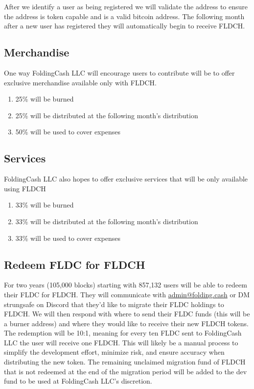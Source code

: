 \documentclass[letterpaper,12pt,titlepage]{article}
\makeatletter
\def\adminEmail{\href{mailto:admin@folding.cash}{admin@folding.cash}}
\def\org{FoldingCash LLC}
\def\ticker{FLDCH}
\def\startingBlock{857,132}
\makeatother
\begin{document}
After we identify a user as being registered we will validate the address to ensure the address is token capable and is a valid bitcoin address. The following month after a new user has registered they will automatically begin to receive \ticker{}.

\subsection{Merchandise}
One way \org{} will encourage users to contribute will be to offer exclusive merchandise available only with \ticker{}.

\begin{enumerate}
    \item 25\% will be burned
    \item 25\% will be distributed at the following month's distribution
    \item 50\% will be used to cover expenses
\end{enumerate}

\subsection{Services}
\org{} also hopes to offer exclusive services that will be only available using \ticker{}

\begin{enumerate}
    \item 33\% will be burned
    \item 33\% will be distributed at the following month's distribution
    \item 33\% will be used to cover expenses
\end{enumerate}

\subsection{Redeem FLDC for FLDCH}
For two years (105,000 blocks) starting with \startingBlock{} users will be able to redeem their FLDC for \ticker{}. They will communicate with \adminEmail{} or DM strungsafe on Discord that they'd like to migrate their FLDC holdings to \ticker{}. We will then respond with where to send their FLDC funds (this will be a burner address) and where they would like to receive their new \ticker{} tokens. The redemption will be 10:1, meaning for every ten FLDC sent to \org{} the user will receive one \ticker{}. This will likely be a manual process to simplify the development effort, minimize risk, and ensure accuracy when distributing the new token. The remaining unclaimed migration fund of \ticker{} that is not redeemed at the end of the migration period will be added to the dev fund to be used at \org{'s} discretion.
\end{document}
